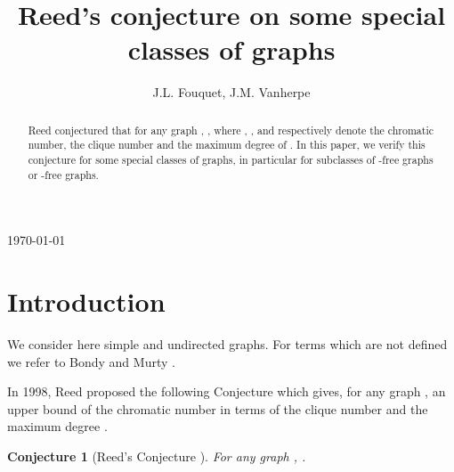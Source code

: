\documentclass{amsart}
\newtheorem{conj}[thm]{Conjecture}
\theoremstyle{definition}
\theoremstyle{remark}
\begin{document}
\title[]{Reed's conjecture on some special classes of graphs}
\author{J.L. Fouquet, J.M. Vanherpe }
\address{L.I.F.O., Facult\'e des Sciences, B.P. 6759 \\
Universit\'e d'Orl\'eans, 45067 Orl\'eans Cedex 2, FR}
 

\begin{abstract}

Reed  conjectured that for any graph , , 
where , , and  respectively denote the chromatic number, the clique number and the maximum degree of . 
In this paper, we verify this conjecture for some special classes of graphs, in particular for subclasses of -free graphs or -free graphs.
\end{abstract}

\maketitle
\begin{center}
\today
\end{center}

\section{Introduction}
We consider here simple and undirected graphs. For terms which are not defined we refer to Bondy and Murty \cite{BonMur08}.


In 1998, Reed proposed the following Conjecture which gives, for any graph , an upper bound of the chromatic number  in terms of the clique number  and the maximum degree .



\begin{conj}[Reed's Conjecture \cite{Ree1998}] \label{Conjecture:Reed1998} For any graph , .
\end{conj}
\end{document}
